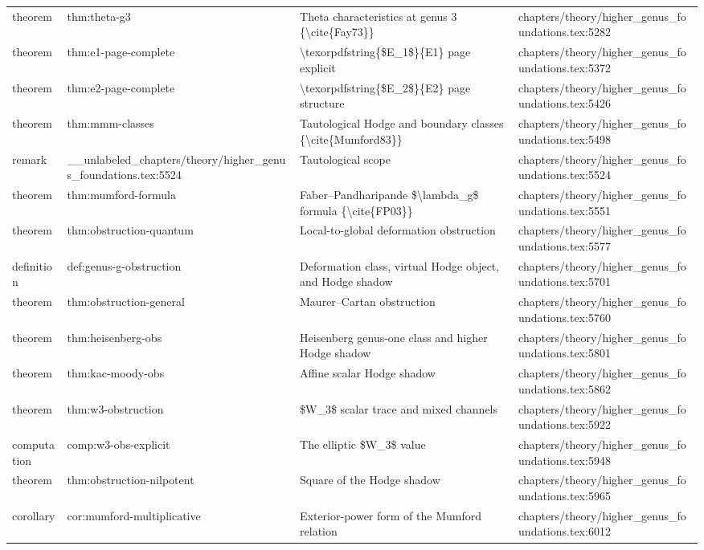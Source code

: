 \documentclass[11pt]{article}
\begin{document}
\begin{longtable}{L{0.10\textwidth}L{0.26\textwidth}L{0.42\textwidth}L{0.22\textwidth}}
theorem & thm:theta-g3 & Theta characteristics at genus 3 \{\textbackslash{}cite\{Fay73\}\} & chapters/theory/higher\_genus\_foundations.tex:5282\\
theorem & thm:e1-page-complete & \textbackslash{}texorpdfstring\{\$E\_1\$\}\{E1\} page explicit & chapters/theory/higher\_genus\_foundations.tex:5372\\
theorem & thm:e2-page-complete & \textbackslash{}texorpdfstring\{\$E\_2\$\}\{E2\} page structure & chapters/theory/higher\_genus\_foundations.tex:5426\\
theorem & thm:mmm-classes & Tautological Hodge and boundary classes \{\textbackslash{}cite\{Mumford83\}\} & chapters/theory/higher\_genus\_foundations.tex:5498\\
remark & \_\_unlabeled\_chapters/theory/higher\_genus\_foundations.tex:5524 & Tautological scope & chapters/theory/higher\_genus\_foundations.tex:5524\\
theorem & thm:mumford-formula & Faber--Pandharipande \$\textbackslash{}lambda\_g\$ formula \{\textbackslash{}cite\{FP03\}\} & chapters/theory/higher\_genus\_foundations.tex:5551\\
theorem & thm:obstruction-quantum & Local-to-global deformation obstruction & chapters/theory/higher\_genus\_foundations.tex:5577\\
definition & def:genus-g-obstruction & Deformation class, virtual Hodge object, and Hodge shadow & chapters/theory/higher\_genus\_foundations.tex:5701\\
theorem & thm:obstruction-general & Maurer--Cartan obstruction & chapters/theory/higher\_genus\_foundations.tex:5760\\
theorem & thm:heisenberg-obs & Heisenberg genus-one class and higher Hodge shadow & chapters/theory/higher\_genus\_foundations.tex:5801\\
theorem & thm:kac-moody-obs & Affine scalar Hodge shadow & chapters/theory/higher\_genus\_foundations.tex:5862\\
theorem & thm:w3-obstruction & \$W\_3\$ scalar trace and mixed channels & chapters/theory/higher\_genus\_foundations.tex:5922\\
computation & comp:w3-obs-explicit & The elliptic \$W\_3\$ value & chapters/theory/higher\_genus\_foundations.tex:5948\\
theorem & thm:obstruction-nilpotent & Square of the Hodge shadow & chapters/theory/higher\_genus\_foundations.tex:5965\\
corollary & cor:mumford-multiplicative & Exterior-power form of the Mumford relation & chapters/theory/higher\_genus\_foundations.tex:6012\\

\end{longtable}
\end{document}
